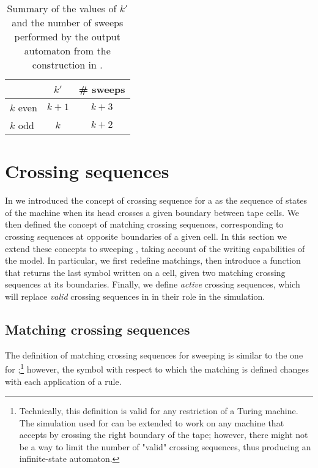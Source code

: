 \begin{table}
	\centering
	\begin{tabular}{lcc}
		\toprule
		~        & $k'$  & \# sweeps \\
		\midrule
		$k$ even & $k+1$ & $k+3$     \\
		$k$ odd  & $k$   & $k+2$     \\
		\bottomrule
	\end{tabular}
	\caption{Summary of the values of $k'$ and the number of sweeps performed by the output automaton from the construction in .}
	\label{tab:kprimesweep}
\end{table}



\section{Crossing sequences}\label{sec:crossseqswdla}
In  we introduced the concept of crossing sequence for a \TDFA as the sequence of states of the machine when its head crosses a given boundary between tape cells.
We then defined the concept of matching crossing sequences, corresponding to crossing sequences at opposite boundaries of a given cell.
In this section we extend these concepts to sweeping \kDLAs, taking account of the writing capabilities of the model.
In particular, we first redefine matchings, then introduce a function that returns the last symbol written on a cell, given two matching crossing sequences at its boundaries.
Finally, we define \emph{active} crossing sequences, which will replace \emph{valid} crossing sequences in \TDFAs in their role in the simulation.


\subsection{Matching crossing sequences}
The definition of matching crossing sequences for sweeping \kDLAs is similar to the one for \TDFAs;\footnote{%
	Technically, this definition is valid for any restriction of a Turing machine. The simulation used for \TDFAs can be extended to work on any machine that accepts by crossing the right boundary of the tape; however, there might not be a way to limit the number of "valid" crossing sequences, thus producing an infinite-state automaton.}
however, the symbol with respect to which the matching is defined changes with each application of a rule.

